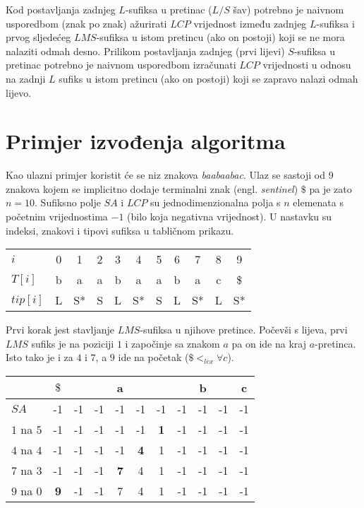 \documentclass[times, utf8, proizvoljni, numeric]{fer}
\begin{document}
Kod postavljanja zadnjeg $L$-sufiksa u pretinac ($L/S$ šav) potrebno je naivnom usporedbom (znak po znak) ažurirati $LCP$ vrijednost između zadnjeg $L$-sufiksa i prvog sljedećeg $LMS$-sufiksa u istom pretincu (ako on postoji) koji se ne mora nalaziti odmah desno. Prilikom postavljanja zadnjeg (prvi lijevi) $S$-sufiksa u pretinac potrebno je naivnom usporedbom izračunati $LCP$ vrijednosti u odnosu na zadnji $L$ sufiks u istom pretincu (ako on postoji) koji se zapravo nalazi odmah lijevo.

\chapter{Primjer izvođenja algoritma}

Kao ulazni primjer koristit će se niz znakova \textit{baabaabac}. Ulaz se sastoji od 9 znakova kojem se implicitno dodaje terminalni znak (engl. \textit{sentinel}) $\$$ pa je zato $n=10$. Sufiksno polje $SA$ i $LCP$ su jednodimenzionalna polja s $n$ elemenata s početnim vrijednostima $-1$ (bilo koja negativna vrijednost). U nastavku su indeksi, znakovi i tipovi sufiksa u tabličnom prikazu.

\begin{center}
	\begin{tabular}{l | c c c c c c c c c c |}
		$i$ & 0 & 1 & 2 & 3 & 4 & 5 & 6 & 7 & 8 & 9 \\
		$T[i]$ & b & a & a & b & a & a & b & a & c & \$ \\
		$tip[i]$ & L & S* & S & L & S* & S & L & S* & L & S* \\
	\end{tabular}
\end{center}

Prvi korak jest stavljanje $LMS$-sufiksa u njihove pretince. Počevši s lijeva, prvi $LMS$ sufiks je na poziciji $1$ i započinje sa znakom $a$ pa on ide na kraj $a$-pretinca. Isto tako je i za $4$ i $7$, a $9$ ide na početak ($\$ <_{lex} \forall c$).

\begin{center}
\begin{tabular}{l | c | c c c c c | c c c | c |}
	& $\$$ & & & a & & & & b & & c \\ \hline
	$SA$ & -1 & -1 & -1 & -1 & -1 & -1 & -1 & -1 & -1 & -1 \\ \hline
	$1$ na $5$ & -1 & -1 & -1 & -1 & -1 & \textbf{1} & -1 & -1 & -1 & -1 \\
	$4$ na $4$ & -1 & -1 & -1 & -1 & \textbf{4} & 1 & -1 & -1 & -1 & -1 \\
	$7$ na $3$ & -1 & -1 & -1 & \textbf{7} & 4 & 1 & -1 & -1 & -1 & -1 \\
	$9$ na $0$ & \textbf{9} & -1 & -1 & 7 & 4 & 1 & -1 & -1 & -1 & -1 \\
\end{tabular}
\end{center}
\end{document}
